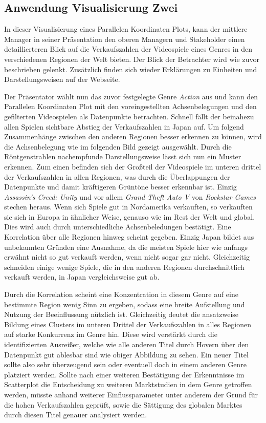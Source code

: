 \documentclass[usegeometry=true]{scrartcl}
\begin{document}
\subsection{Anwendung Visualisierung Zwei}
In dieser Visualisierung eines Parallelen Koordinaten Plots, kann der mittlere Manager in seiner Präsentation den oberen Managern und Stakeholder einen detaillierteren Blick auf die Verkaufszahlen der Videospiele eines Genres in den verschiedenen Regionen der Welt bieten.
Der Blick der Betrachter wird wie zuvor beschrieben gelenkt.
Zusätzlich finden sich wieder Erklärungen zu Einheiten und Darstellungsweisen auf der Webseite.

Der Präsentator wählt nun das zuvor festgelegte Genre \textit{Action} aus und kann den Parallelen Koordinaten Plot mit den voreingestellten Achsenbelegungen und den gefilterten Videospielen als Datenpunkte betrachten. 
Schnell fällt der beinahezu allen Spielen sichtbare Abstieg der Verkaufszahlen in Japan auf. 
Um folgend Zusammenhänge zwischen den anderen Regionen besser erkennen zu können, wird die Achsenbelegung wie im folgenden Bild gezeigt ausgewählt.
Durch die Röntgenstrahlen nachempfunde Darstellungsweise lässt sich nun ein Muster erkennen. 
Zum einen befinden sich der Großteil der Videospiele im unteren drittel der Verkaufszahlen in allen Regionen, was durch die Überlappungen der Datenpunkte und damit kräftigeren Grüntöne besser erkennbar ist.
Einzig \textit{Assassin's Creed: Unity} und vor allem \textit{Grand Theft Auto V} von \textit{Rockstar Games} stechen heraus. 
Wenn sich Spiele gut in Nordamerika verkauften, so verkauften sie sich in Europa in ähnlicher Weise, genauso wie im Rest der Welt und global.
Dies wird auch durch unterschiedliche Achsenbeledungen bestätigt. Eine Korrelation über alle Regionen hinweg scheint gegeben. 
Einzig Japan bildet aus unbekannten Gründen eine Ausnahme, da die meisten Spiele hier wie anfangs erwähnt nicht so gut verkauft werden, wenn nicht sogar gar nicht. 
Gleichzeitig schneiden einige wenige Spiele, die in den anderen Regionen durchschnittlich verkauft werden, in Japan vergleichsweise gut ab. 

Durch die Korrelation scheint eine Konzentration in diesem Genre auf eine bestimmte Region wenig Sinn zu ergeben, sodass eine breite Aufstellung und Nutzung der Beeinflussung nützlich ist.
Gleichzeitig deutet die ansatzweise Bildung eines Clusters im unteren Drittel der Verkaufszahlen in alles Regionen auf starke Konkurrenz im Genre hin. 
Diese wird verstärkt durch die identifizierten Ausreißer, welche wie alle anderen Titel durch Hovern über den Datenpunkt gut ablesbar sind wie obiger Abbildung zu sehen.
Ein neuer Titel sollte also sehr überzeugend sein oder eventuell doch in einem anderen Genre platziert werden. 
Sollte nach einer weiteren Bestätigung der Erkenntnisse im Scatterplot die Entscheidung zu weiteren Marktstudien in dem Genre getroffen werden, müsste anhand weiterer Einflussparameter unter anderem der Grund für die hohen Verkaufszahlen geprüft, sowie die Sättigung des globalen Marktes durch diesen Titel genauer analysiert werden.
\end{document}
